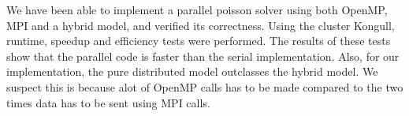 We have been able to implement a parallel poisson solver using both OpenMP, MPI and a hybrid model, and verified its correctness. Using the cluster Kongull, runtime, speedup and efficiency tests were performed. The results of these tests show that the parallel code is faster than the serial implementation. Also, for our implementation, the pure distributed model outclasses the hybrid model. We suspect this is because alot of OpenMP calls has to be made compared to the two times data has to be sent using MPI calls. 